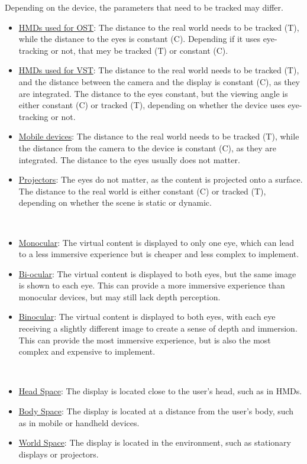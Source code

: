 \begin{description}
    Depending on the device, the parameters that need to be tracked may differ.
    \begin{itemize}
        \item \ul{HMDs used for OST}: The distance to the real world needs to be tracked (T), while the distance to the eyes is constant (C). Depending if it uses eye-tracking or not, that mey be tracked (T) or constant (C).
        \item \ul{HMDs used for VST}: The distance to the real world needs to be tracked (T), and the distance between the camera and the display is constant (C), as they are integrated. The distance to the eyes constant, but the viewing angle is either constant (C) or tracked (T), depending on whether the device uses eye-tracking or not.
        \item \ul{Mobile devices}: The distance to the real world needs to be tracked (T), while the distance from the camera to the device is constant (C), as they are integrated. The distance to the eyes usually does not matter.
        \item \ul{Projectors}: The eyes do not matter, as the content is projected onto a surface. The distance to the real world is either constant (C) or tracked (T), depending on whether the scene is static or dynamic.
    \end{itemize}

    \item[Occularity in HMDs]~
    \begin{itemize}
        \item \ul{Monocular}: The virtual content is displayed to only one eye, which can lead to a less immersive experience but is cheaper and less complex to implement.
        \item \ul{Bi-ocular}: The virtual content is displayed to both eyes, but the same image is shown to each eye. This can provide a more immersive experience than monocular devices, but may still lack depth perception.
        \item \ul{Binocular}: The virtual content is displayed to both eyes, with each eye receiving a slightly different image to create a sense of depth and immersion. This can provide the most immersive experience, but is also the most complex and expensive to implement.
    \end{itemize}

    \item[Distance to the display]~
    \begin{itemize}
        \item \ul{Head Space}: The display is located close to the user's head, such as in HMDs.
        \item \ul{Body Space}: The display is located at a distance from the user's body, such as in mobile or handheld devices.
        \item \ul{World Space}: The display is located in the environment, such as stationary displays or projectors.
    \end{itemize}


\end{description}
